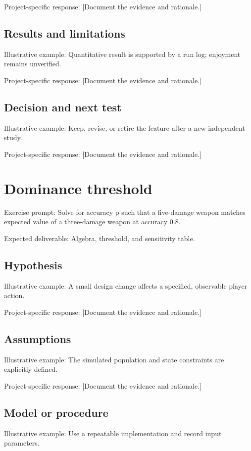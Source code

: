 \documentclass[11pt]{article}
\begin{document}
Project-specific response: [Document the evidence and rationale.]


\subsection{Results and limitations}
Illustrative example: Quantitative result is supported by a run log; enjoyment remains unverified.

Project-specific response: [Document the evidence and rationale.]


\subsection{Decision and next test}
Illustrative example: Keep, revise, or retire the feature after a new independent study.

Project-specific response: [Document the evidence and rationale.]


\section{Dominance threshold}
Exercise prompt: Solve for accuracy p such that a five-damage weapon matches expected value of a three-damage weapon at accuracy 0.8.

Expected deliverable: Algebra, threshold, and sensitivity table.


\subsection{Hypothesis}
Illustrative example: A small design change affects a specified, observable player action.

Project-specific response: [Document the evidence and rationale.]


\subsection{Assumptions}
Illustrative example: The simulated population and state constraints are explicitly defined.

Project-specific response: [Document the evidence and rationale.]


\subsection{Model or procedure}
Illustrative example: Use a repeatable implementation and record input parameters.
\end{document}
